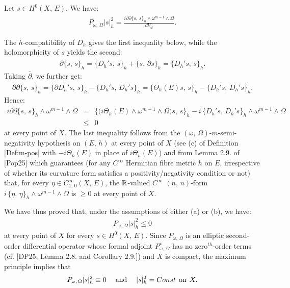 \documentclass[12pt]{article}
\begin{document}
Let $s\in H^0(X,\,E)$. We have: \begin{eqnarray*}P_{\omega,\,\Omega}|s|^2_h = \frac{i\bar\partial\partial\{s,\,s\}_h\wedge\omega^{m-1}\wedge\Omega}{dV_\omega}.\end{eqnarray*}

The $h$-compatibility of $D_h$ gives the first inequality below, while the holomorphicity of $s$ yields the second: \begin{eqnarray*}\partial\{s,\,s\}_h = \{D_h's,\,s\}_h + \{s,\,\bar\partial s\}_h = \{D_h's,\,s\}_h.\end{eqnarray*} Taking $\bar\partial$, we further get: \begin{eqnarray*}\bar\partial\partial\{s,\,s\}_h = \{\bar\partial D_h's,\,s\}_h - \{D_h's,\,D_h's\}_h = \{\Theta_h(E)s,\,s\}_h - \{D_h's,\,D_h's\}_h.\end{eqnarray*} Hence: \begin{eqnarray*}i\bar\partial\partial\{s,\,s\}_h\wedge\omega^{m-1}\wedge\Omega & = & \bigg\{\bigg(i\Theta_h(E)\wedge\omega^{m-1}\wedge\Omega\bigg)s,\,s\bigg\}_h - i\,\{D_h's,\,D_h's\}_h\wedge\omega^{m-1}\wedge\Omega \\
  & \leq & 0\end{eqnarray*} at every point of $X$. The last inequality follows from the $(\omega,\,\Omega)$-$m$-semi-negativity hypothesis on $(E,\,h)$ at every point of $X$ (see (c) of Definition \ref{Def:m-pos} with $-i\Theta_h(E)$ in place of $i\Theta_h(E)$) and from Lemma 2.9. of [Pop25] which guarantees (for any $C^\infty$ Hermitian fibre metric $h$ on $E$, irrespective of whether its curvature form satisfies a positivity/negativity condition or not) that, for every $\eta\in C^\infty_{1,\,0}(X,\,E)$, the $\mathbb{R}$-valued $C^\infty$ $(n,\,n)$-form $i\,\{\eta,\,\eta\}_h\wedge\omega^{m-1}\wedge\Omega$ is $\geq 0$ at every point of $X$. 

  We have thus proved that, under the assumptions of either (a) or (b), we have: \begin{eqnarray}\label{eqn:P_s-squared_formula}P_{\omega,\,\Omega}|s|^2_h \leq 0\end{eqnarray} at every point of $X$ for every $s\in H^0(X,\,E)$. Since $P_{\omega,\,\Omega}$ is an elliptic second-order differential operator whose formal adjoint $P_{\omega,\,\Omega}^\star$ has no zero$^{th}$-order terms (cf. [DP25, Lemma 2.8. and Corollary 2.9.]) and $X$ is compact, the maximum principle implies that \begin{eqnarray*}P_{\omega,\,\Omega}|s|^2_h\equiv 0 \hspace{3ex}\mbox{and}\hspace{3ex} |s|^2_h = Const \hspace{1ex} \mbox{on}\hspace{1ex} X.\end{eqnarray*}
\end{document}
